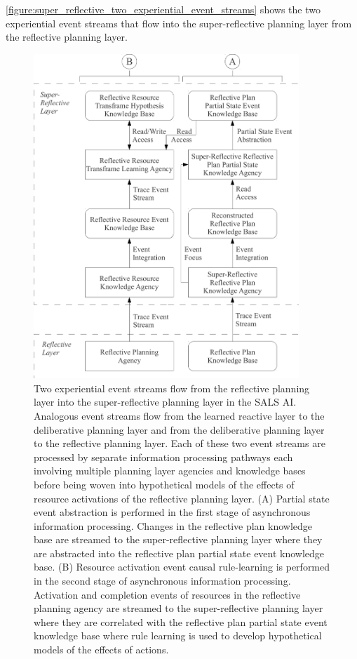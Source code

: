 {\mbox{\autoref{figure:super_reflective_two_experiential_event_streams}}}
shows the two experiential event streams that flow into the
super-reflective planning layer from the reflective planning layer.
\begin{figure}
\centering
\includegraphics[width=10cm]{gfx/super_reflective_two_experiential_event_streams}
\caption[Two experiential event streams flow from the reflective
  planning layer into the super-reflective planning layer in the SALS
  AI.]{Two experiential event streams flow from the reflective
  planning layer into the super-reflective planning layer in the SALS
  AI.  Analogous event streams flow from the learned reactive layer to
  the deliberative planning layer and from the deliberative planning
  layer to the reflective planning layer.  Each of these two event
  streams are processed by separate information processing pathways
  each involving multiple planning layer agencies and knowledge bases
  before being woven into hypothetical models of the effects of
  resource activations of the reflective planning layer.  (A) Partial
  state event abstraction is performed in the first stage of
  asynchronous information processing.  Changes in the reflective plan
  knowledge base are streamed to the super-reflective planning layer
  where they are abstracted into the reflective plan partial state
  event knowledge base.  (B) Resource activation event causal
  rule-learning is performed in the second stage of asynchronous
  information processing.  Activation and completion events of
  resources in the reflective planning agency are streamed to the
  super-reflective planning layer where they are correlated with the
  reflective plan partial state event knowledge base where rule
  learning is used to develop hypothetical models of the effects of
  actions.}
\label{figure:super_reflective_two_experiential_event_streams}
\end{figure}

